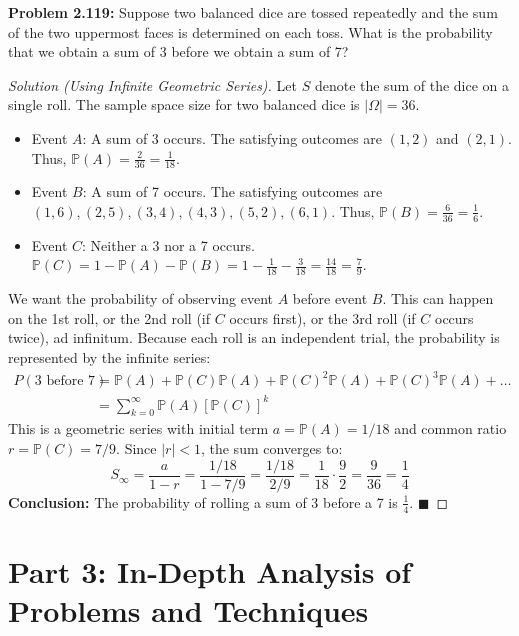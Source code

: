 \documentclass[12pt]{article}
\theoremstyle{definition}
\theoremstyle{remark}
\begin{document}
\textbf{Problem 2.119:} Suppose two balanced dice are tossed repeatedly and the sum of the two uppermost faces is determined on each toss. What is the probability that we obtain a sum of 3 before we obtain a sum of 7?
\begin{proof}[Solution (Using Infinite Geometric Series)]
Let $S$ denote the sum of the dice on a single roll. The sample space size for two balanced dice is $|\Omega| = 36$.
\begin{itemize}
    \item Event $A$: A sum of 3 occurs. The satisfying outcomes are $(1,2)$ and $(2,1)$. Thus, $\mathbb{P}(A) = \frac{2}{36} = \frac{1}{18}$.
    \item Event $B$: A sum of 7 occurs. The satisfying outcomes are $(1,6), (2,5), (3,4), (4,3), (5,2), (6,1)$. Thus, $\mathbb{P}(B) = \frac{6}{36} = \frac{1}{6}$.
    \item Event $C$: Neither a 3 nor a 7 occurs. $\mathbb{P}(C) = 1 - \mathbb{P}(A) - \mathbb{P}(B) = 1 - \frac{1}{18} - \frac{3}{18} = \frac{14}{18} = \frac{7}{9}$.
\end{itemize}
We want the probability of observing event $A$ before event $B$. This can happen on the 1st roll, or the 2nd roll (if $C$ occurs first), or the 3rd roll (if $C$ occurs twice), ad infinitum. Because each roll is an independent trial, the probability is represented by the infinite series:
\begin{align*}
P(\text{3 before 7}) &= \mathbb{P}(A) + \mathbb{P}(C)\mathbb{P}(A) + \mathbb{P}(C)^2\mathbb{P}(A) + \mathbb{P}(C)^3\mathbb{P}(A) + \dots \\
&= \sum_{k=0}^{\infty} \mathbb{P}(A) [\mathbb{P}(C)]^k
\end{align*}
This is a geometric series with initial term $a = \mathbb{P}(A) = 1/18$ and common ratio $r = \mathbb{P}(C) = 7/9$. Since $|r| < 1$, the sum converges to:
\[ S_\infty = \frac{a}{1 - r} = \frac{1/18}{1 - 7/9} = \frac{1/18}{2/9} = \frac{1}{18} \cdot \frac{9}{2} = \frac{9}{36} = \frac{1}{4} \]
\textbf{Conclusion:} The probability of rolling a sum of 3 before a 7 is $\frac{1}{4}$. $\blacksquare$
\end{proof}

\newpage
\section{Part 3: In-Depth Analysis of Problems and Techniques}
\end{document}
